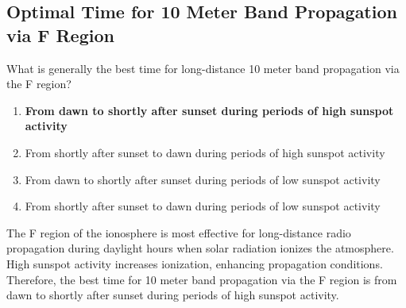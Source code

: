 \subsection{Optimal Time for 10 Meter Band Propagation via F Region}
\label{T3C09}

\begin{tcolorbox}[colback=gray!10!white,colframe=black!75!black,title=T3C09]
What is generally the best time for long-distance 10 meter band propagation via the F region?
\begin{enumerate}[noitemsep]
    \item \textbf{From dawn to shortly after sunset during periods of high sunspot activity}
    \item From shortly after sunset to dawn during periods of high sunspot activity
    \item From dawn to shortly after sunset during periods of low sunspot activity
    \item From shortly after sunset to dawn during periods of low sunspot activity
\end{enumerate}
\end{tcolorbox}

The F region of the ionosphere is most effective for long-distance radio propagation during daylight hours when solar radiation ionizes the atmosphere. High sunspot activity increases ionization, enhancing propagation conditions. Therefore, the best time for 10 meter band propagation via the F region is from dawn to shortly after sunset during periods of high sunspot activity.
